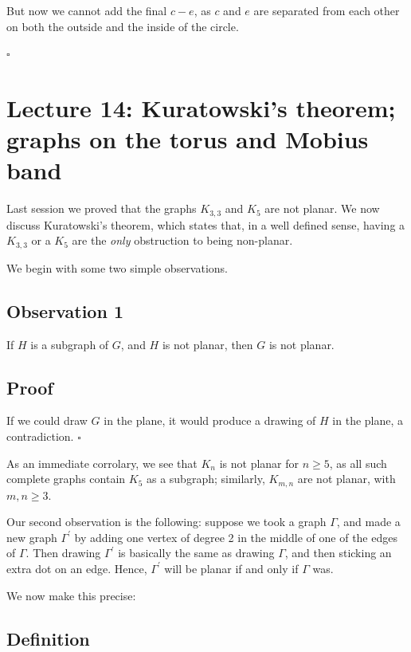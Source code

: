 \documentclass[]{article}
\begin{document}
But now we cannot add the final \(c-e\), as \(c\) and \(e\) are
separated from each other on both the outside and the inside of the
circle.

\(\square\)

\section{Lecture 14: Kuratowski's theorem; graphs on the torus and Mobius band}

Last session we proved that the graphs \(K_{3,3}\) and \(K_5\) are not
planar. We now discuss Kuratowski's theorem, which states that, in a
well defined sense, having a \(K_{3,3}\) or a \(K_5\) are the
\emph{only} obstruction to being non-planar.

We begin with some two simple observations.

\subsection{Observation 1}\label{observation-1}

If \(H\) is a subgraph of \(G\), and \(H\) is not planar, then \(G\) is
not planar.

\subsection{Proof}\label{proof-11}

If we could draw \(G\) in the plane, it would produce a drawing of \(H\)
in the plane, a contradiction. \(\square\)

As an immediate corrolary, we see that \(K_n\) is not planar for
\(n\geq 5\), as all such complete graphs contain \(K_5\) as a subgraph;
similarly, \(K_{m,n}\) are not planar, with \(m,n\geq 3\).

Our second observation is the following: suppose we took a graph
\(\Gamma\), and made a new graph \(\Gamma^\prime\) by adding one vertex
of degree 2 in the middle of one of the edges of \(\Gamma\). Then
drawing \(\Gamma^\prime\) is basically the same as drawing \(\Gamma\),
and then sticking an extra dot on an edge. Hence, \(\Gamma^\prime\) will
be planar if and only if \(\Gamma\) was.

We now make this precise:

\subsection{Definition}\label{definition-13}
\end{document}
